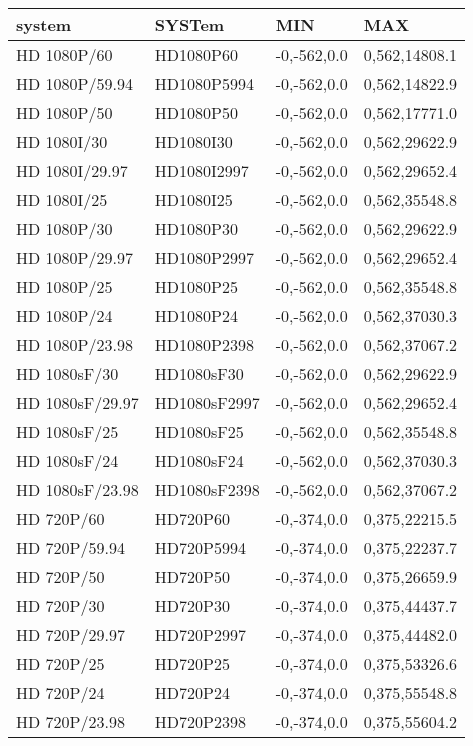 \begin{tabular}{l l l l}

system      &       SYSTem    &      MIN     &        MAX \\ \hline


HD 1080P/60     &   HD1080P60   & -0,-562,0.0 & 0,562,14808.1\\
HD 1080P/59.94  &   HD1080P5994 & -0,-562,0.0 & 0,562,14822.9\\
HD 1080P/50     &   HD1080P50   & -0,-562,0.0 & 0,562,17771.0\\
HD 1080I/30     &   HD1080I30   & -0,-562,0.0 & 0,562,29622.9\\
HD 1080I/29.97  &   HD1080I2997 & -0,-562,0.0 & 0,562,29652.4\\
HD 1080I/25     &   HD1080I25   & -0,-562,0.0 & 0,562,35548.8\\
HD 1080P/30     &   HD1080P30   & -0,-562,0.0 & 0,562,29622.9\\
HD 1080P/29.97  &   HD1080P2997 & -0,-562,0.0 & 0,562,29652.4\\
HD 1080P/25     &   HD1080P25   & -0,-562,0.0 & 0,562,35548.8\\
HD 1080P/24     &   HD1080P24   & -0,-562,0.0 & 0,562,37030.3\\
HD 1080P/23.98  &   HD1080P2398 & -0,-562,0.0 & 0,562,37067.2\\
HD 1080sF/30    &   HD1080sF30  & -0,-562,0.0 & 0,562,29622.9\\
HD 1080sF/29.97 &   HD1080sF2997& -0,-562,0.0 & 0,562,29652.4\\
HD 1080sF/25    &   HD1080sF25  & -0,-562,0.0 & 0,562,35548.8\\
HD 1080sF/24    &   HD1080sF24  & -0,-562,0.0 & 0,562,37030.3\\
HD 1080sF/23.98 &   HD1080sF2398& -0,-562,0.0 & 0,562,37067.2\\
HD 720P/60      &   HD720P60    & -0,-374,0.0 & 0,375,22215.5\\
HD 720P/59.94   &   HD720P5994  & -0,-374,0.0 & 0,375,22237.7\\
HD 720P/50      &   HD720P50    & -0,-374,0.0 & 0,375,26659.9\\
HD 720P/30      &   HD720P30    & -0,-374,0.0 & 0,375,44437.7\\
HD 720P/29.97   &   HD720P2997  & -0,-374,0.0 & 0,375,44482.0\\
HD 720P/25      &   HD720P25    & -0,-374,0.0 & 0,375,53326.6\\
HD 720P/24      &   HD720P24    & -0,-374,0.0 & 0,375,55548.8\\
HD 720P/23.98   &   HD720P2398  & -0,-374,0.0 & 0,375,55604.2\\
\end{tabular}

